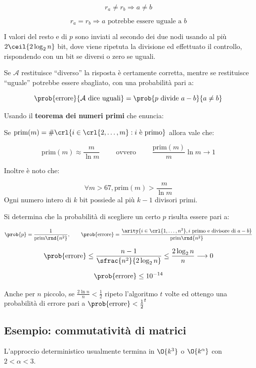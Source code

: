 \documentclass[\main/main.tex]{subfiles}
\begin{document}
\[
	r_a \neq r_b \Rightarrow a \neq b
\]

\[
	r_a = r_b \Rightarrow a \text{ potrebbe essere uguale a } b
\]

I valori del resto e di \(p\) sono inviati al secondo dei due nodi usando al più \(2\ceil{2\log_2{n}}\) bit, dove viene ripetuta la divisione ed effettuato il controllo, rispondendo con un bit se diversi o zero se uguali.

Se \(\mathcal{A}\) restituisce ``diverso'' la risposta è certamente corretta, mentre se restituisce ``uguale'' potrebbe essere sbagliato, con una probabilità pari a:

\[
	\prob{\text{errore}}{\mathcal{A}\text{ dice uguali}} = \prob{p \text{ divide }a-b}{a \neq b}
\]

Usando il \textbf{teorema dei numeri primi} che enuncia:

\begin{theorem}
	Se \(\text{prim}(m) = \#\crl{i \in \crl{2, \ldots, m}: i \text{ è primo}}\) allora vale che:

	\[
		\text{prim}(m) \approx \frac{m}{\ln m} \qquad \text{ ovvero } \qquad \frac{\text{prim}(m)}{m}\ln m \longrightarrow 1
	\]

	Inoltre è noto che:

	\[
		\forall m > 67, \text{prim}(m) > \frac{m}{\ln m}
	\]
	Ogni numero intero di \(k\) bit possiede al più \(k-1\) divisori primi.
\end{theorem}

Si determina che la probabilità di scegliere un certo \(p\) risulta essere pari a:

\[
	\prob{p} = \frac{1}{\text{prim}\rnd{n^2}}, \qquad \prob{\text{errore}} = \frac{\arity{i \in \crl{1, \ldots, n^2}, i \text{ primo e divisore di }a-b}}{\text{prim}\rnd{n^2}}
\]

\[
	\prob{\text{errore}} \leq \frac{n-1}{\sfrac{n^2}{2\log_2 n}} \leq \frac{2\log_2 n}{n} \longrightarrow 0
\]

\[
	\prob{\text{errore}} \leq 10^{-14}
\]

Anche per \(n\) piccolo, se \(\frac{2\ln n}{n} < \frac{1}{2}\) ripeto l'algoritmo \(t\) volte ed ottengo una probabilità di errore pari a \(\prob{\text{errore}} < \frac{1}{2}^t\)

\subsection{Esempio: commutatività di matrici}
L'approccio deterministico usualmente termina in \(\O{k^3}\) o \(\O{k^\alpha}\) con \(2 < \alpha < 3\).
\end{document}

